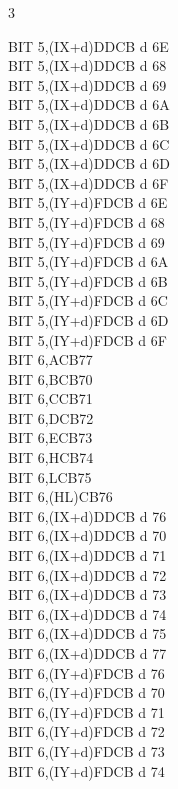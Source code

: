 \begin{multicols}{3}
{\begin{tabbing}
		BIT 5,(IX+d)\>DDCB d 6E\\
		BIT 5,(IX+d)\UNDOC\>DDCB d 68\\
		BIT 5,(IX+d)\UNDOC\>DDCB d 69\\
		BIT 5,(IX+d)\UNDOC\>DDCB d 6A\\
		BIT 5,(IX+d)\UNDOC\>DDCB d 6B\\
		BIT 5,(IX+d)\UNDOC\>DDCB d 6C\\
		BIT 5,(IX+d)\UNDOC\>DDCB d 6D\\
		BIT 5,(IX+d)\UNDOC\>DDCB d 6F\\
		BIT 5,(IY+d)\>FDCB d 6E\\
		BIT 5,(IY+d)\UNDOC\>FDCB d 68\\
		BIT 5,(IY+d)\UNDOC\>FDCB d 69\\
		BIT 5,(IY+d)\UNDOC\>FDCB d 6A\\
		BIT 5,(IY+d)\UNDOC\>FDCB d 6B\\
		BIT 5,(IY+d)\UNDOC\>FDCB d 6C\\
		BIT 5,(IY+d)\UNDOC\>FDCB d 6D\\
		BIT 5,(IY+d)\UNDOC\>FDCB d 6F\\
		BIT 6,A\>CB77\\
		BIT 6,B\>CB70\\
		BIT 6,C\>CB71\\
		BIT 6,D\>CB72\\
		BIT 6,E\>CB73\\
		BIT 6,H\>CB74\\
		BIT 6,L\>CB75\\
		BIT 6,(HL)\>CB76\\
		BIT 6,(IX+d)\>DDCB d 76\\
		BIT 6,(IX+d)\UNDOC\>DDCB d 70\\
		BIT 6,(IX+d)\UNDOC\>DDCB d 71\\
		BIT 6,(IX+d)\UNDOC\>DDCB d 72\\
		BIT 6,(IX+d)\UNDOC\>DDCB d 73\\
		BIT 6,(IX+d)\UNDOC\>DDCB d 74\\
		BIT 6,(IX+d)\UNDOC\>DDCB d 75\\
		BIT 6,(IX+d)\UNDOC\>DDCB d 77\\
		BIT 6,(IY+d)\>FDCB d 76\\
		BIT 6,(IY+d)\UNDOC\>FDCB d 70\\
		BIT 6,(IY+d)\UNDOC\>FDCB d 71\\
		BIT 6,(IY+d)\UNDOC\>FDCB d 72\\
		BIT 6,(IY+d)\UNDOC\>FDCB d 73\\
		BIT 6,(IY+d)\UNDOC\>FDCB d 74\\

\end{tabbing}}
\end{multicols}
